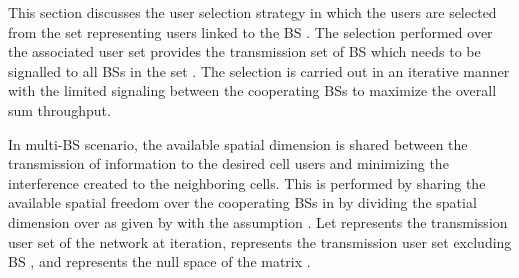 
This section discusses the user selection strategy in which the users are selected from the set  representing users linked to the BS . The selection performed over the associated user set  provides the transmission set  of BS  which needs to be signalled to all BSs in the set . The selection is carried out in an iterative manner with the limited signaling between the cooperating BSs to maximize the overall sum throughput.

In multi-BS scenario, the available spatial dimension  is shared between the transmission of information to the desired cell users and minimizing the interference created to the neighboring cells. This is performed by sharing the available spatial freedom  over the cooperating BSs in  by dividing the spatial dimension over  as given by  with the assumption . Let  represents the transmission user set of the network at  iteration,  represents the transmission user set excluding BS , and  represents the null space of the matrix .
